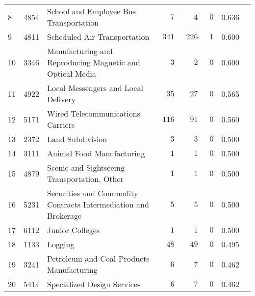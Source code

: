 \documentclass[9pt, oneside]{article}   	%
\begin{document}
\begin{longtable}{lcp{3 in}ccccc}
8  & 4854 & School and Employee Bus Transportation & $\phantom{000}7$ & $\phantom{000}4$ & $\phantom{0}0$ & 0.636 \\
9  & 4811 & Scheduled Air Transportation & $\phantom{0}341$ & $\phantom{0}226$ & $\phantom{0}1$ & 0.600 \\
10  & 3346 & Manufacturing and Reproducing Magnetic and Optical Media & $\phantom{000}3$ & $\phantom{000}2$ & $\phantom{0}0$ & 0.600 \\
11  & 4922 & Local Messengers and Local Delivery & $\phantom{00}35$ & $\phantom{00}27$ & $\phantom{0}0$ & 0.565 \\
12  & 5171 & Wired Telecommunications Carriers & $\phantom{0}116$ & $\phantom{00}91$ & $\phantom{0}0$ & 0.560 \\
13  & 2372 & Land Subdivision & $\phantom{000}3$ & $\phantom{000}3$ & $\phantom{0}0$ & 0.500 \\
14  & 3111 & Animal Food Manufacturing & $\phantom{000}1$ & $\phantom{000}1$ & $\phantom{0}0$ & 0.500 \\
15  & 4879 & Scenic and Sightseeing Transportation, Other & $\phantom{000}1$ & $\phantom{000}1$ & $\phantom{0}0$ & 0.500 \\
16  & 5231 & Securities and Commodity Contracts Intermediation and Brokerage & $\phantom{000}5$ & $\phantom{000}5$ & $\phantom{0}0$ & 0.500 \\
17  & 6112 & Junior Colleges & $\phantom{000}1$ & $\phantom{000}1$ & $\phantom{0}0$ & 0.500 \\
18  & 1133 & Logging & $\phantom{00}48$ & $\phantom{00}49$ & $\phantom{0}0$ & 0.495 \\
19  & 3241 & Petroleum and Coal Products Manufacturing & $\phantom{000}6$ & $\phantom{000}7$ & $\phantom{0}0$ & 0.462 \\
20  & 5414 & Specialized Design Services & $\phantom{000}6$ & $\phantom{000}7$ & $\phantom{0}0$ & 0.462 \\


\end{longtable}
\end{document}
